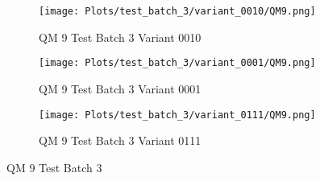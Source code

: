 \documentclass{DissertateFigs}
\begin{document}
\begin{figure}[t!]
\medskip

    \begin{subfigure}{0.47\textwidth}
    \texttt{[image: Plots/test\_batch\_3/variant\_0010/QM9.png]}
    \caption{QM 9 Test Batch 3 Variant 0010}
    \end{subfigure}
    \begin{subfigure}{0.47\textwidth}
    \texttt{[image: Plots/test\_batch\_3/variant\_0001/QM9.png]}
    \caption{QM 9 Test Batch 3 Variant 0001}
    \end{subfigure}

\medskip

    \begin{subfigure}{0.47\textwidth}
    \texttt{[image: Plots/test\_batch\_3/variant\_0111/QM9.png]}
    \caption{QM 9 Test Batch 3 Variant 0111}
    \end{subfigure}
\caption{QM 9 Test Batch 3}
    \end{figure}
\clearpage
\end{document}
